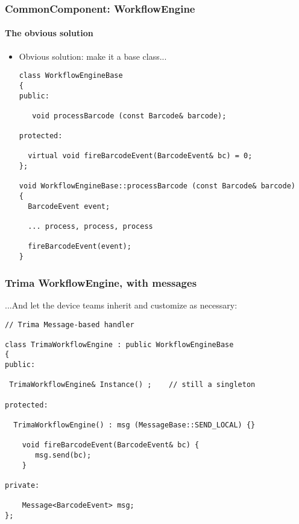 \begin{frame}[fragile,t]
\frametitle{CommonComponent: WorkflowEngine}
\framesubtitle{The obvious solution}

\begin{itemize}[<+->]
\item Obvious solution: make it a base class...
{\scriptsize
\begin{verbatim}
class WorkflowEngineBase
{
public:

   void processBarcode (const Barcode& barcode);

protected:

  virtual void fireBarcodeEvent(BarcodeEvent& bc) = 0;
};

void WorkflowEngineBase::processBarcode (const Barcode& barcode)
{
  BarcodeEvent event;

  ... process, process, process

  fireBarcodeEvent(event);
}
\end{verbatim}
}
\end{itemize}

\end{frame}

\begin{frame}[fragile,t]
\frametitle{Trima WorkflowEngine, with messages}
...And let the device teams inherit and customize as necessary:
{\scriptsize
\begin{verbatim}
// Trima Message-based handler

class TrimaWorkflowEngine : public WorkflowEngineBase
{
public:

 TrimaWorkflowEngine& Instance() ;    // still a singleton

protected:

  TrimaWorkflowEngine() : msg (MessageBase::SEND_LOCAL) {}

    void fireBarcodeEvent(BarcodeEvent& bc) {
       msg.send(bc);
    }

private:

    Message<BarcodeEvent> msg;
};


\end{verbatim}
}
\end{frame}

